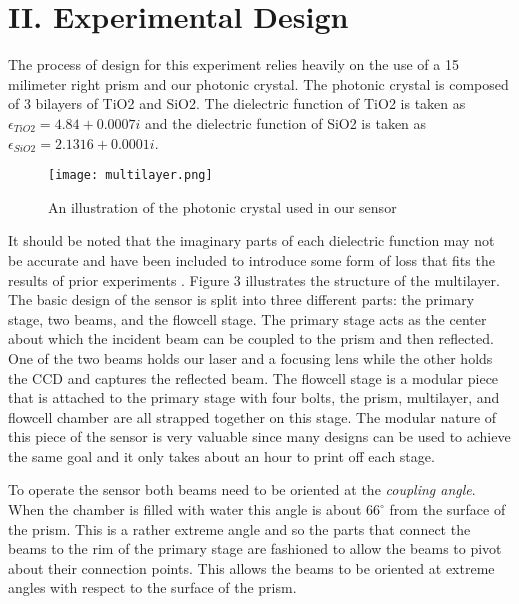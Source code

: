 \section*{\textbf{II. Experimental Design}}

\hspace{0.15in}
The process of design for this experiment relies heavily on the use of a 15 milimeter right prism and our photonic crystal. The photonic crystal is composed of 3 bilayers of TiO2 and SiO2. The dielectric function of TiO2 is taken as $\epsilon_{TiO2} = 4.84 + 0.0007i$ and the dielectric function of SiO2 is taken as $\epsilon_{SiO2} = 2.1316 + 0.0001i$. 

\begin{wrapfigure}{R}{2in}
    \texttt{[image: multilayer.png]}
    \caption{An illustration of the photonic crystal used in our sensor}
    \label{fig:multilayer}
\end{wrapfigure}

It should be noted that the imaginary parts of each dielectric function may not be accurate and have been included to introduce some form of loss that fits the results of prior experiments \cite{}. Figure 3 illustrates the structure of the multilayer.
The basic design of the sensor is split into three different parts: the primary stage, two beams, and the flowcell stage. The primary stage acts as the center about which the incident beam can be coupled to the prism and then reflected. One of the two beams holds our laser and a focusing lens while the other holds the CCD and captures the reflected beam. The flowcell stage is a modular piece that is attached to the primary stage with four bolts, the prism, multilayer, and flowcell chamber are all strapped together on this stage. The modular nature of this piece of the sensor is very valuable since many designs can be used to achieve the same goal and it only takes about an hour to print off each stage.\\
\vspace{0.1in}

\begin{figure}[h]
\end{figure}

To operate the sensor both beams need to be oriented at the \textit{coupling angle}. When the chamber is filled with water this angle is about $66^{\circ}$ from the surface of the prism. This is a rather extreme angle and so the parts that connect the beams to the rim of the primary stage are fashioned to allow the beams to pivot about their connection points. This allows the beams to be oriented at extreme angles with respect to the surface of the prism.